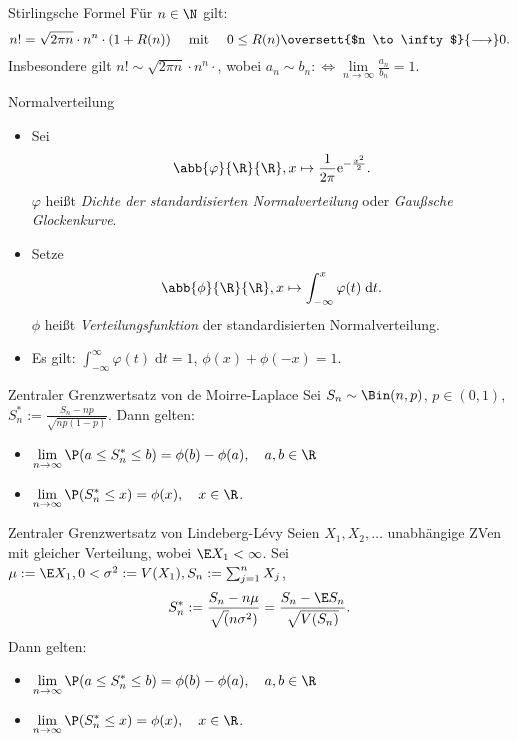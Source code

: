 \begin{karte}{Stirlingsche Formel}
	Für $n \in \N$ gilt:
	$$ n! = \sqrt{2\pi n}\cdot n^n \cdot (1+R(n)) \quad \text{ mit } \quad 0 \leq R(n)
	 \oversett{$n \to \infty$}{\longrightarrow} 0.$$
	Insbesondere gilt $n! \sim \sqrt{2\pi n}\cdot n^n \cdot$, wobei $a_n \sim b_n :\Leftrightarrow 
	\lim\limits_{n \to \infty}\frac{a_n}{b_n} = 1$.
\end{karte}

\begin{karte}{Normalverteilung}
	\begin{itemize}
		\item Sei $$\abb{\varphi}{\R}{\R}, x \mapsto \frac{1}{2\pi}\mathrm{e}^{-\frac{x^2}{2}}.$$ $\varphi$
		 heißt \textit{Dichte der standardisierten Normalverteilung} oder \textit{Gaußsche Glockenkurve}. 
		\item Setze $$\abb{\phi}{\R}{\R}, x \mapsto \int_{-\infty}^{x} \varphi(t) \; \mathrm{d}t.$$ $\phi$
		 heißt \textit{Verteilungsfunktion} der standardisierten Normalverteilung.
		\item Es gilt: $ \displaystyle \int_{-\infty}^{\infty} \varphi(t) \; \mathrm{d}t = 1$,
		 $\phi(x)+\phi(-x)=1$.
	\end{itemize}
\end{karte}

\begin{karte}{Zentraler Grenzwertsatz von de Moirre-Laplace}
	Sei $S_n \sim \Bin(n,p)$, $p \in (0,1)$, $S_n^\ast := \frac{S_n-np}{\sqrt{np(1-p)}}$. Dann gelten:
	\begin{itemize}
		\item $\displaystyle \lim\limits_{n \to \infty} \P(a \leq S_n^\ast \leq b) = \phi(b)-\phi(a), \quad a,b \in \R$
		\item $\displaystyle \lim\limits_{n \to \infty} \P(S_n^\ast \leq x) = \phi(x), \quad x \in \R$.
	\end{itemize}
\end{karte}

\begin{karte}{Zentraler Grenzwertsatz von Lindeberg-Lévy}
	Seien $X_1,X_2,\dotsc$ unabhängige ZVen mit gleicher Verteilung, wobei $\E X_1 < \infty$. 
	Sei $\mu := \E X_1, 0 < \sigma^2 := V(X_1), S_n := \sum_{j=1}^{n} X_j$, 
	$$S_n^\ast := \frac{S_n-n\mu}{\sqrt(n\sigma^2)} = \frac{S_n-\E S_n}{\sqrt{V(S_n)}}.$$
	Dann gelten:
	\begin{itemize}
		\item $\displaystyle \lim\limits_{n \to \infty} \P(a \leq S_n^\ast \leq b) = \phi(b)-\phi(a), \quad a,b \in \R$
		\item $\displaystyle \lim\limits_{n \to \infty} \P(S_n^\ast \leq x) = \phi(x), \quad x \in \R$.
	\end{itemize}
\end{karte}